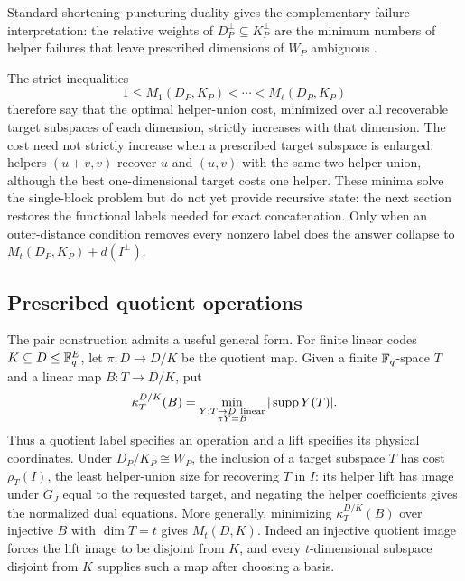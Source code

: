 Standard shortening--puncturing duality gives the complementary failure
interpretation: the relative weights of
$D_P^\perp\subseteq K_P^\perp$ are the minimum numbers of helper failures
that leave prescribed dimensions of $W_P$ ambiguous
\cite{LuoEtAl2005,GeilEtAl2014}.

The strict inequalities
\[
 1\leq M_1(D_P,K_P)<\cdots<M_\ell(D_P,K_P)
\]
therefore say that the optimal helper-union cost, minimized over all recoverable
target subspaces of each dimension, strictly increases with that dimension.
The cost need not strictly increase when a prescribed target subspace is
enlarged: helpers $(u+v,v)$ recover $u$ and $(u,v)$ with the same two-helper
union, although the best one-dimensional target costs one helper.
These minima solve the single-block problem but
do not yet provide recursive state: the next section restores the functional
labels needed for exact concatenation.  Only when an outer-distance condition
removes every nonzero label does the answer collapse to
$M_t(D_P,K_P)+d(I^\perp)$.

\subsection{Prescribed quotient operations}

The pair construction admits a useful general form.  For finite linear codes
$K\subseteq D\leq\mathbb F_q^E$, let $\pi:D\to D/K$ be the quotient map.
Given a finite $\mathbb F_q$-space $T$ and a linear map $B:T\to D/K$, put
\[
 \kappa_T^{D/K}(B)=
 \min_{\substack{Y:T\to D\ \mathrm{linear}\\\pi Y=B}}
 |\operatorname{supp} Y(T)|.
\]
Thus a quotient label specifies an operation and a lift specifies its
physical coordinates.  Under $D_P/K_P\cong W_P$, the inclusion of a
target subspace $T$ has cost $\rho_T(I)$, the least helper-union size
for recovering $T$ in $I$: its helper lift has image under
$G_J$ equal to the requested target, and negating the helper coefficients
gives the normalized dual equations.  More generally, minimizing
$\kappa_T^{D/K}(B)$ over injective $B$ with $\dim T=t$ gives $M_t(D,K)$.
Indeed an injective quotient image forces the lift image to be disjoint
from $K$, and every $t$-dimensional subspace disjoint from $K$ supplies
such a map after choosing a basis.

